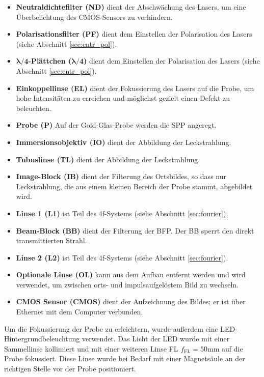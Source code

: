 \documentclass[titlepage,  ngerman]{article}
\begin{document}
		\begin{itemize}
			\item \textbf{Neutraldichtefilter (ND)} dient der Abschwächung des Lasers, um eine Überbelichtung des CMOS-Sensors zu verhindern.
			\item \textbf{Polarisationsfilter (PF)} dient dem Einstellen der Polarisation des Lasers (siehe Abschnitt \ref{sec:cntr_pol}).
			\item $\boldsymbol{\lambda / 4}$\textbf{-Plättchen (}$\boldsymbol{\lambda / 4}$\textbf{)} dient dem Einstellen der Polarisation des Lasers (siehe Abschnitt \ref{sec:cntr_pol}).
			\item \textbf{Einkoppellinse (EL)} dient der Fokussierung des Lasers auf die Probe, um hohe Intensitäten zu erreichen und möglichst gezielt einen Defekt zu beleuchten.
			\item \textbf{Probe (P)} Auf der Gold-Glas-Probe werden die SPP angeregt.
			\item \textbf{Immersionsobjektiv (IO)} dient der Abbildung der Leckstrahlung.
			\item \textbf{Tubuslinse (TL)} dient der Abbildung der Leckstrahlung.
			\item \textbf{Image-Block (IB)} dient der Filterung des Ortsbildes, so dass nur Leckstrahlung, die aus einem kleinen Bereich der Probe stammt, abgebildet wird.			
			\item \textbf{Linse 1 (L1)} ist Teil des 4f-Systems (siehe Abschnitt \ref{sec:fourier}).
			\item \textbf{Beam-Block (BB)} dient der Filterung der BFP. Der BB sperrt den direkt transmittierten Strahl.			
			\item \textbf{Linse 2 (L2)} ist Teil des 4f-Systems (siehe Abschnitt \ref{sec:fourier}).
			\item \textbf{Optionale Linse (OL)} kann aus dem Aufbau entfernt werden und wird verwendet, um zwischen orts- und impulsaufgelöstem Bild zu wechseln.
			\item \textbf{CMOS Sensor (CMOS)}  dient der Aufzeichnung des Bildes; er ist über Ethernet mit dem Computer verbunden.			
		\end{itemize}
		Um die Fokussierung der Probe zu erleichtern, wurde außerdem eine LED-Hintergrundbeleuchtung verwendet. Das Licht der LED wurde mit einer Sammellinse kollimiert und mit einer weiteren Linse FL $f_{\mathrm{FL}}=50\mathrm{mm}$ auf die  Probe fokussiert. Diese Linse wurde bei Bedarf mit einer Magnetsäule an der richtigen Stelle vor der Probe positioniert.
		
\end{document}

